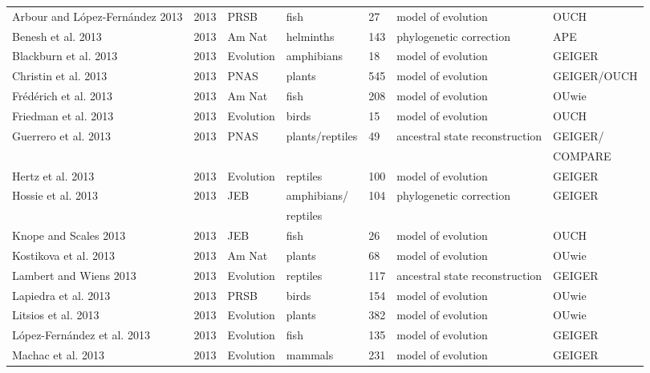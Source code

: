 \begin{landscape}
\begin{center}
\begin{longtable}{p{6cm}llllll}
Arbour and López-Fernández 2013   &   2013    &   PRSB    &   fish    &   27  &   model of evolution  &   OUCH    \\
Benesh et al. 2013    &   2013    &   Am Nat  &   helminths   &   143 &   phylogenetic correction &   APE \\
Blackburn et al. 2013 &   2013    &   Evolution   &   amphibians  &   18  &   model of evolution  &   GEIGER  \\
Christin et al. 2013  &   2013    &   PNAS    &   plants  &   545 &   model of evolution  &   GEIGER/OUCH \\
Frédérich et al. 2013 &   2013    &   Am Nat  &   fish    &   208 &   model of evolution  &   OUwie   \\
Friedman et al. 2013  &   2013    &   Evolution   &   birds   &   15  &   model of evolution  &   OUCH    \\
Guerrero et al. 2013  &   2013    &   PNAS    &   plants/reptiles &   49  &   ancestral state reconstruction  &   GEIGER/ \\
    &       &       &       &       &       &   COMPARE \\
Hertz et al. 2013 &   2013    &   Evolution   &   reptiles    &   100 &   model of evolution  &   GEIGER  \\
Hossie et al. 2013    &   2013    &   JEB &   amphibians/ &   104 &   phylogenetic correction &   GEIGER  \\
    &       &       &   reptiles    &       &       &       \\
Knope and Scales 2013 &   2013    &   JEB &   fish    &   26  &   model of evolution  &   OUCH    \\
Kostikova et al. 2013 &   2013    &   Am Nat  &   plants  &   68  &   model of evolution  &   OUwie   \\
Lambert and Wiens 2013    &   2013    &   Evolution   &   reptiles    &   117 &   ancestral state reconstruction  &   GEIGER  \\
Lapiedra et al. 2013  &   2013    &   PRSB    &   birds   &   154 &   model of evolution  &   OUwie   \\
Litsios et al. 2013   &   2013    &   Evolution   &   plants  &   382 &   model of evolution  &   OUwie   \\
López-Fernández et al. 2013   &   2013    &   Evolution   &   fish    &   135 &   model of evolution  &   GEIGER  \\
Machac et al. 2013    &   2013    &   Evolution   &   mammals &   231 &   model of evolution  &   GEIGER  \\

\end{longtable}
\end{center}
\end{landscape}

